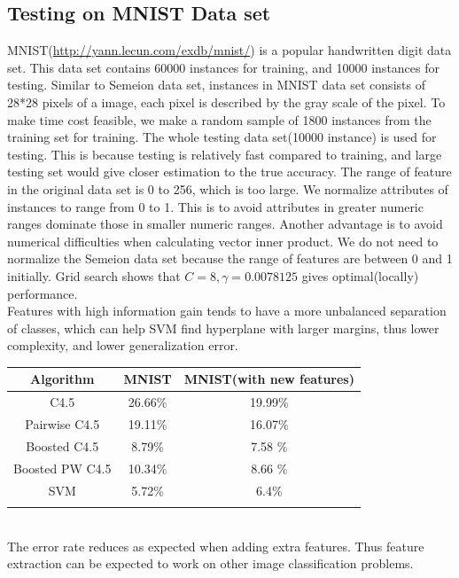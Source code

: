 \documentclass[a4paper,11pt]{article}
\begin{document}
\subsection{Testing on MNIST Data set}
MNIST(\url{http://yann.lecun.com/exdb/mnist/}) is a popular handwritten digit data set. This data set contains 60000 instances for training, and 10000 instances for testing.  Similar to Semeion data set, instances in MNIST data set consists of 28*28 pixels of a image, each pixel is described by the gray scale of the pixel. To make time cost feasible, we make a random sample of 1800 instances from the training set for training. The whole testing data set(10000 instance) is used for testing. This is because testing is relatively fast compared to training, and large testing set would give closer estimation to the true accuracy. The range of feature in the original data set is 0 to 256, which is too large. We normalize attributes of instances to range from 0 to 1. This is to avoid attributes in greater numeric ranges dominate those in smaller numeric ranges. Another advantage is to avoid numerical difficulties when calculating vector inner product\cite{svm}. We do not need to normalize the Semeion data set because the range of features are between 0 and 1 initially. Grid search shows that $C=8, \gamma=0.0078125$ gives optimal(locally) performance.\\
Features with high information gain tends to have a more unbalanced separation of classes, which can help SVM find hyperplane with larger margins, thus lower complexity, and lower generalization error.\\
\vspace{0.5cm}
\begin{tabular}{c c c}
Algorithm	              & MNIST	& MNIST(with new features)\\
\hline \hline
C4.5                     & 26.66\%  & 19.99\%\\
Pairwise C4.5            &19.11\%   & 16.07\%\\
Boosted C4.5             & 8.79\%	& 7.58 \%\\
Boosted PW C4.5	         & 10.34\%  & 8.66 \%\\
SVM                      & 5.72\%   & 6.4\%\\
  \\
\end{tabular}
\vspace{0.5cm}\\
The error rate reduces as expected when adding extra features. Thus feature extraction can be expected to work on other image classification problems.\\
\end{document}
